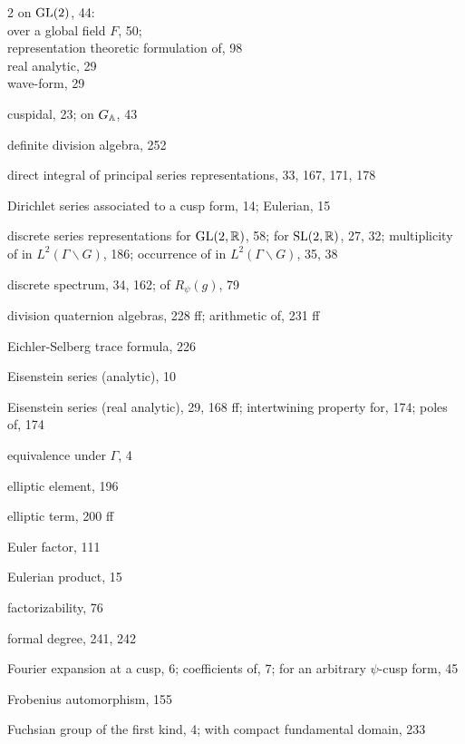 \begin{multicols}{2}
\hspace*{1em}on $\operatorname{GL}(2)$, 44:\\
\hspace*{2em}over a global field $F$, 50;\\
\hspace*{2em}representation theoretic formulation of, 98\\
\hspace*{1em}real analytic, 29\\
\hspace*{1em}wave-form, 29\par
\noindent cuspidal, 23; on $G_{\mathbb{A}}$, 43\par
\noindent definite division algebra, 252\par
\noindent direct integral of principal series representations, 33, 167, 171, 178\par
\noindent Dirichlet series associated to a cusp form, 14; Eulerian, 15\par
\noindent discrete series representations for $\operatorname{GL}(2,\mathbb{R})$, 58; for $\operatorname{SL}(2,\mathbb{R})$, 27, 32; multiplicity of in $L^2(\Gamma\backslash G)$, 186; occurrence of in $L^2(\Gamma\backslash G)$, 35, 38\par
\noindent discrete spectrum, 34, 162; of $R_\psi(g)$, 79\par
\noindent division quaternion algebras, 228 ff; arithmetic of, 231 ff\par
\noindent Eichler-Selberg trace formula, 226\par
\noindent Eisenstein series (analytic), 10\par
\noindent Eisenstein series (real analytic), 29, 168 ff; intertwining property for, 174; poles of, 174\par
\noindent equivalence under $\Gamma$, 4\par
\noindent elliptic element, 196\par
\noindent elliptic term, 200 ff\par
\noindent Euler factor, 111\par
\noindent Eulerian product, 15\par
\noindent factorizability, 76\par
\noindent formal degree, 241, 242\par
\noindent Fourier expansion at a cusp, 6; coefficients of, 7; for an arbitrary $\psi$-cusp form, 45\par
\noindent Frobenius automorphism, 155\par
\noindent Fuchsian group of the first kind, 4; with compact fundamental domain, 233\par

\end{multicols}
